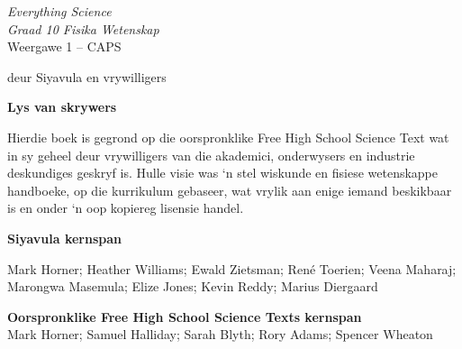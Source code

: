 
\begin{titlepage}
\begin{center}
    \thispagestyle{empty}

    \vspace*{4in}

    
    {\normalfont\sffamily\fontsize{36}\normalfont\itshape{Everything Science} \\ \vspace*{1cm}
     \normalfont\sffamily\fontsize{22}\normalfont\itshape{Graad 10 Fisika Wetenskap}}
    \vspace*{1in} \\
    \LARGE Weergawe 1 -- CAPS \\

   {\vspace*{2in}
     deur Siyavula en vrywilligers
  

\vfill

    }
\end{center}
\end{titlepage}






\newpage
\thispagestyle{empty}


\begin{flushleft} \textbf{\huge Lys van skrywers} \end{flushleft}

{\Large Hierdie boek is gegrond op die oorspronklike Free High School Science Text wat in sy geheel deur vrywilligers van die akademici, onderwysers en industrie deskundiges geskryf is. Hulle visie was ‘n stel wiskunde en fisiese wetenskappe handboeke, op die kurrikulum gebaseer, wat vrylik aan enige iemand beskikbaar is en onder ‘n oop kopiereg lisensie handel.\par } 

\textbf{\Large Siyavula kernspan} 

Mark Horner; Heather Williams; Ewald Zietsman; Ren\'{e} Toerien; Veena Maharaj; Marongwa Masemula; Elize Jones; Kevin Reddy; Marius Diergaard \par

\textbf{\Large Oorspronklike Free High School Science Texts kernspan}\\

Mark Horner; Samuel Halliday; Sarah Blyth; Rory Adams; Spencer Wheaton \par 


